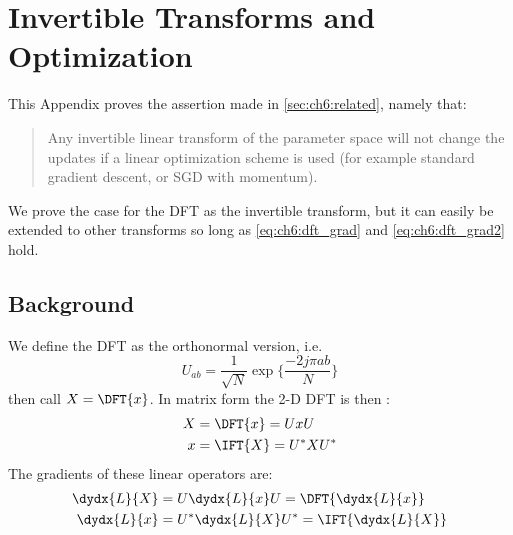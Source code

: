 \chapter{Invertible Transforms and Optimization} \label{app:ch6:invertible}
This Appendix proves the assertion made in \autoref{sec:ch6:related}, namely
that:
\begin{quote}
  Any invertible linear transform of the parameter space will not change the updates if a linear
  optimization scheme is used (for example standard gradient descent, or SGD with momentum).
\end{quote}
We prove the case for the DFT as the invertible transform, but it can easily be
extended to other transforms so long as \eqref{eq:ch6:dft_grad} and
\eqref{eq:ch6:dft_grad2} hold.

\section{Background}
We define the DFT as the orthonormal version, i.e.
$$ U_{ab} = \frac{1}{\sqrt{N}} \exp\{ \frac{-2j\pi ab}{N} \} $$
%
then call $X = \DFT{x}$. In matrix form the 2-D DFT is then
\cite[Chapter 2]{petrou_image_2010}:
\begin{align}
  X &= \DFT{x} = UxU \\
  x &= \IFT{X} = U^*XU^* 
\end{align}
The gradients of these linear operators are:
\begin{align}
  \dydx{L}{X} &= U \dydx{L}{x} U = \DFT{\dydx{L}{x}} \label{eq:ch6:dft_grad}\\
  \dydx{L}{x} &= U^* \dydx{L}{X} U^* = \IFT{\dydx{L}{X}} \label{eq:ch6:dft_grad2}
\end{align}

